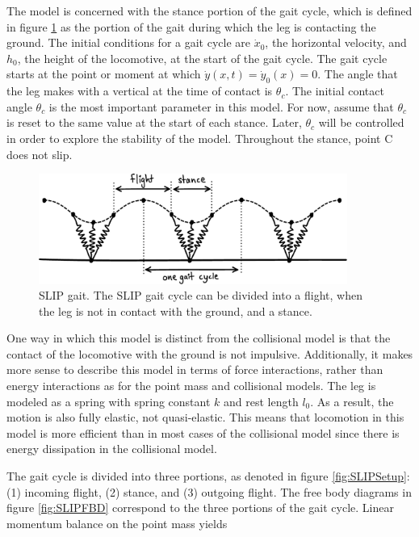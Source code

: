 The model is concerned with the stance portion of the gait cycle, which is defined in figure \ref{fig:SLIPGait} as the portion of the gait during which the leg is contacting the ground.  The initial conditions for a gait cycle are $\dot{x}_{0}$, the horizontal velocity, and $h_{0}$, the height of the locomotive, at the start of the gait cycle. The gait cycle starts at the point or moment at which $\dot{y}(x,t) = \dot{y}_{0}(x) = 0$. The angle that the leg makes with a vertical at the time of contact is $\theta_c$. The initial contact angle $\theta_c$ is the most important parameter in this model. For now, assume that $\theta_c$ is reset to the same value at the start of each stance. Later, $\theta_c$ will be controlled in order to explore the stability of the model. Throughout the stance, point C does not slip.

\begin{figure}[h]		%
\begin{centering}
\includegraphics[width=0.9\textwidth]{Figures/SLIPGait}\par
\end{centering}
\caption[Diagram: SLIP Gait]{SLIP gait. The SLIP gait cycle can be divided into a flight, when the leg is not in contact with the ground, and a stance.}
\label{fig:SLIPGait}
\end{figure}
%

One way in which this model is distinct from the collisional model is that the contact of the locomotive with the ground is not impulsive. Additionally, it makes more sense to describe this model in terms of force interactions, rather than energy interactions as for the point mass and collisional models. The leg is modeled as a spring with spring constant $k$ and rest length $l_0$. As a result, the motion is also fully elastic, not quasi-elastic. This means that locomotion in this model is more efficient than in most cases of the collisional model since there is energy dissipation in the collisional model.

The gait cycle is divided into three portions, as denoted in figure \ref{fig:SLIPSetup}: (1) incoming flight, (2) stance, and (3) outgoing flight. The free body diagrams in figure \ref{fig:SLIPFBD} correspond to the three portions of the gait cycle. Linear momentum balance on the point mass yields


